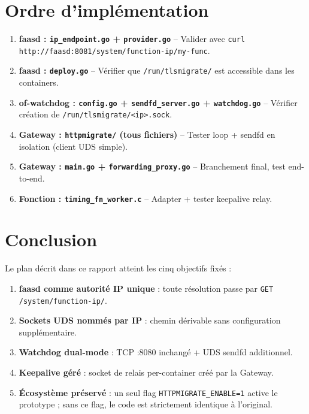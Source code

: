 \documentclass[11pt,a4paper]{article}
\begin{document}
\section{Ordre d'implémentation}

\begin{enumerate}
  \item \textbf{faasd : \texttt{ip\_endpoint.go} + \texttt{provider.go}} -- Valider avec
    \texttt{curl http://faasd:8081/system/function-ip/my-func}.
  \item \textbf{faasd : \texttt{deploy.go}} -- Vérifier que \texttt{/run/tlsmigrate/}
    est accessible dans les containers.
  \item \textbf{of-watchdog : \texttt{config.go} + \texttt{sendfd\_server.go} +
    \texttt{watchdog.go}} -- Vérifier création de \texttt{/run/tlsmigrate/<ip>.sock}.
  \item \textbf{Gateway : \texttt{httpmigrate/} (tous fichiers)} -- Tester loop +
    sendfd en isolation (client UDS simple).
  \item \textbf{Gateway : \texttt{main.go} + \texttt{forwarding\_proxy.go}} --
    Branchement final, test end-to-end.
  \item \textbf{Fonction : \texttt{timing\_fn\_worker.c}} -- Adapter + tester
    keepalive relay.
\end{enumerate}

\section{Conclusion}

Le plan décrit dans ce rapport atteint les cinq objectifs fixés :
\begin{enumerate}
  \item \textbf{faasd comme autorité IP unique} : toute résolution passe par
    \texttt{GET /system/function-ip/}.
  \item \textbf{Sockets UDS nommés par IP} : chemin dérivable sans configuration
    supplémentaire.
  \item \textbf{Watchdog dual-mode} : TCP :8080 inchangé + UDS sendfd additionnel.
  \item \textbf{Keepalive géré} : socket de relais per-container créé par la Gateway.
  \item \textbf{Écosystème préservé} : un seul flag \texttt{HTTPMIGRATE\_ENABLE=1}
    active le prototype ; sans ce flag, le code est strictement identique à l'original.
\end{enumerate}
\end{document}
